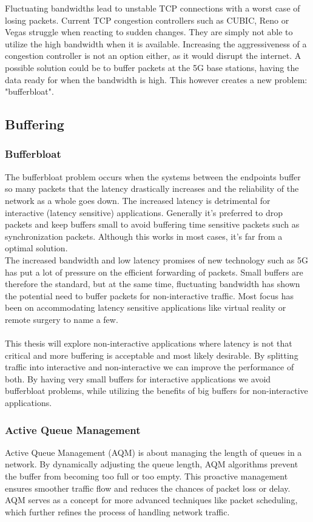\documentclass[a4paper,english, 12pt]{report}
\begin{document}
Fluctuating bandwidths lead to unstable TCP connections with a worst case of losing packets. Current TCP congestion controllers such as CUBIC, Reno or Vegas struggle when reacting to sudden changes.\cite{bandwidth_changes} They are simply not able to utilize the high bandwidth when it is available. Increasing the aggressiveness of a congestion controller is not an option either, as it would disrupt the internet. A possible solution could be to buffer packets at the 5G base stations, having the data ready for when the bandwidth is high. This however creates a new problem: "bufferbloat".


\subsection{Buffering}
\subsubsection{Bufferbloat}
The bufferbloat problem occurs when the systems between the endpoints buffer so many packets that the latency drastically increases and the reliability of the network as a whole goes down. The increased latency is detrimental for interactive (latency sensitive) applications. Generally it's preferred to drop packets and keep buffers small to avoid buffering time sensitive packets such as synchronization packets. Although this works in most cases, it's far from a optimal solution.\\

The increased bandwidth and low latency promises of new technology such as 5G has put a lot of pressure on the efficient forwarding of packets. Small buffers are therefore the standard, but at the same time, fluctuating bandwidth has shown the potential need to buffer packets for non-interactive traffic.
Most focus has been on accommodating latency sensitive applications like virtual reality or remote surgery to name a few.\\\\
This thesis will explore non-interactive applications where latency is not that critical and more buffering is acceptable and most likely desirable. By splitting traffic into interactive and non-interactive we can improve the performance of both. By having very small buffers for interactive applications we avoid bufferbloat problems, while utilizing the benefits of big buffers for non-interactive applications.\\

\subsubsection{Active Queue Management}
Active Queue Management (AQM) is about managing the length of queues in a network. By dynamically adjusting the queue length, AQM algorithms\cite{aqm_survey} prevent the buffer from becoming too full or too empty\cite{aqm}. This proactive management ensures smoother traffic flow and reduces the chances of packet loss or delay. AQM serves as a concept for more advanced techniques like packet scheduling, which further refines the process of handling network traffic.
\end{document}

